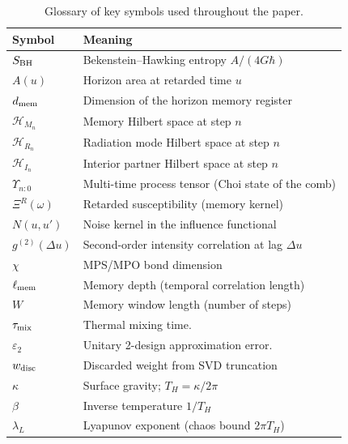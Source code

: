 \documentclass[11pt,a4paper]{article}
\theoremstyle{plain}
\theoremstyle{definition}
\theoremstyle{remark}
\begin{document}
\begin{table}[htbp]
\centering
\caption{Glossary of key symbols used throughout the paper.}
\label{tab:glossary}
\begin{tabular}{ll}
\toprule
Symbol & Meaning \\
\midrule
$S_{\rm BH}$ & Bekenstein--Hawking entropy $A/(4G\hbar)$ \\
$A(u)$ & Horizon area at retarded time $u$ \\
$d_{\rm mem}$ & Dimension of the horizon memory register \\
$\mathcal{H}_{M_n}$ & Memory Hilbert space at step $n$ \\
$\mathcal{H}_{R_n}$ & Radiation mode Hilbert space at step $n$ \\
$\mathcal{H}_{I_n}$ & Interior partner Hilbert space at step $n$ \\
$\Upsilon_{n{:}0}$ & Multi-time process tensor (Choi state of the comb) \\
$\Xi^R(\omega)$ & Retarded susceptibility (memory kernel) \\
$N(u,u')$ & Noise kernel in the influence functional \\
$g^{(2)}(\Delta u)$ & Second-order intensity correlation at lag $\Delta u$ \\
$\chi$ & MPS/MPO bond dimension \\
$\ell_{\rm mem}$ & Memory depth (temporal correlation length) \\
$W$ & Memory window length (number of steps) \\
$\tau_{\rm mix}$ & Thermal mixing time. \\
$\varepsilon_2$ & Unitary 2-design approximation error. \\
$w_{\rm disc}$ & Discarded weight from SVD truncation \\
$\kappa$ & Surface gravity; $T_H=\kappa/2\pi$ \\
$\beta$ & Inverse temperature $1/T_H$ \\
$\lambda_L$ & Lyapunov exponent (chaos bound $2\pi T_H$) \\
\bottomrule
\end{tabular}
\end{table}
\end{document}
